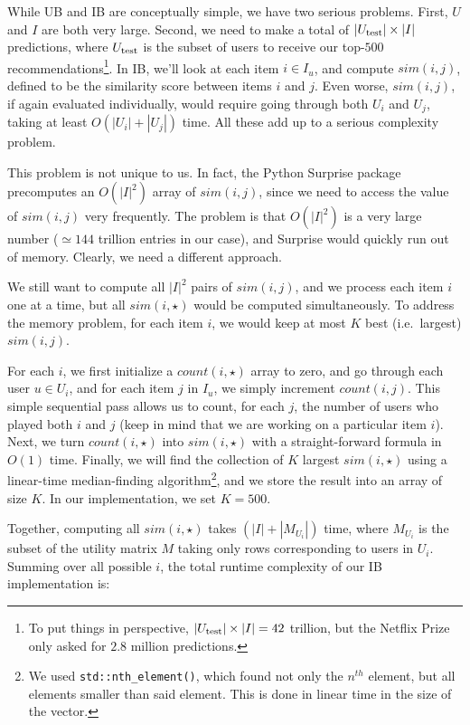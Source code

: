 \documentclass[conference]{IEEEtran}
\begin{document}
While UB and IB are conceptually simple, we have two serious problems.
First, $U$ and $I$ are both very large. Second,
we need to make a total of $|U_{\rm test}|
\times |I|$ predictions,
where $U_{\rm test}$ is the subset of users to receive
our top-$500$ recommendations\footnote{
To put things in perspective, $|U_{\rm test}| \times |I| = 42$ trillion,
but the Netflix Prize only asked for $2.8$ million predictions.}.
In IB, we'll look at each item $i \in I_u$, and
compute $sim(i, j)$, defined to be the similarity score between items $i$
and $j$. Even worse, $sim(i, j)$, if again evaluated individually,
would require going through both $U_i$ and $U_j$, taking at least
$O(|U_i| + |U_j|)$ time. All these add up to a serious complexity problem.

This problem is not unique to us. In fact, the Python Surprise
package \cite{hug2020surprise}
precomputes an $O(|I|^2)$ array of $sim(i, j)$, since
we need to access the value of $sim(i, j)$ very frequently. The problem is
that $O(|I|^2)$ is a very large number ($\simeq 144$ trillion entries in
our case), and 
Surprise would quickly run out of memory. Clearly, we need
a different approach.

We still want to compute all $|I|^2$ pairs of $sim(i,j)$, and we process
each item $i$ one at a time, but all $sim(i,\star)$ would be
computed simultaneously. To address the memory problem, 
for each item $i$, we would keep at most $K$ best (i.e.~largest)
$sim(i,j)$. 

For each $i$, we first initialize a $count(i,\star)$ array
to zero, and go through each user $u \in U_i$, and for each
item $j$ in $I_u$, we simply increment $count(i,j)$. This simple
sequential pass allows us to count, for each $j$,
the number of users who played both $i$ and $j$ (keep in mind that we are
working on a particular item $i$).
Next, we turn $count(i,\star)$ into $sim(i,\star)$
with a straight-forward formula in $O(1)$ time.
Finally, we will
find the collection of $K$ largest $sim(i,\star)$ using
a linear-time median-finding algorithm\footnote{
We used \texttt{std::nth\_element()}, which
found not only the $n^{th}$ element, but all elements smaller than said
element. This is done in linear time in the size of the vector.}, and we
store the result into an array of size $K$.
In our implementation, we set $K = 500$.

Together, computing all $sim(i,\star)$ takes $(|I| + |M_{U_i}|)$ time, where
$M_{U_i}$ is the subset of the utility matrix $M$ taking only rows
corresponding to users in $U_i$. Summing over all possible $i$,
the total runtime complexity of our
IB implementation is:
\end{document}
